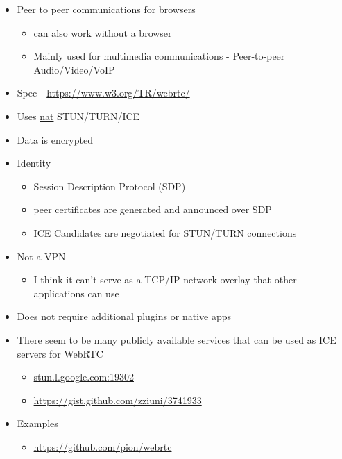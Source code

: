 \begin{itemize}
\tightlist
\item
  Peer to peer communications for browsers

  \begin{itemize}
  \tightlist
  \item
    can also work without a browser
  \item
    Mainly used for multimedia communications - Peer-to-peer
    Audio/Video/VoIP
  \end{itemize}
\item
  Spec -
  \href{https://www.w3.org/TR/webrtc/\#persistent-information-exposed-by-webrtc}{https://www.w3.org/TR/webrtc/}
\item
  Uses \href{notes/02021-internet-protocol.md}{nat} STUN/TURN/ICE
\item
  Data is encrypted
\item
  Identity

  \begin{itemize}
  \tightlist
  \item
    Session Description Protocol (SDP)
  \item
    peer certificates are generated and announced over SDP
  \item
    ICE Candidates are negotiated for STUN/TURN connections
  \end{itemize}
\item
  Not a VPN

  \begin{itemize}
  \tightlist
  \item
    I think it can't serve as a TCP/IP network overlay that other
    applications can use
  \end{itemize}
\item
  Does not require additional plugins or native apps
\item
  There seem to be many publicly available services that can be used as
  ICE servers for WebRTC

  \begin{itemize}
  \tightlist
  \item
    \href{http://stun.l.google.com:19302/}{stun.l.google.com:19302}
  \item
    \url{https://gist.github.com/zziuni/3741933}
  \end{itemize}
\item
  Examples

  \begin{itemize}
  \tightlist
  \item
    \url{https://github.com/pion/webrtc}


\end{itemize}
\end{itemize}
